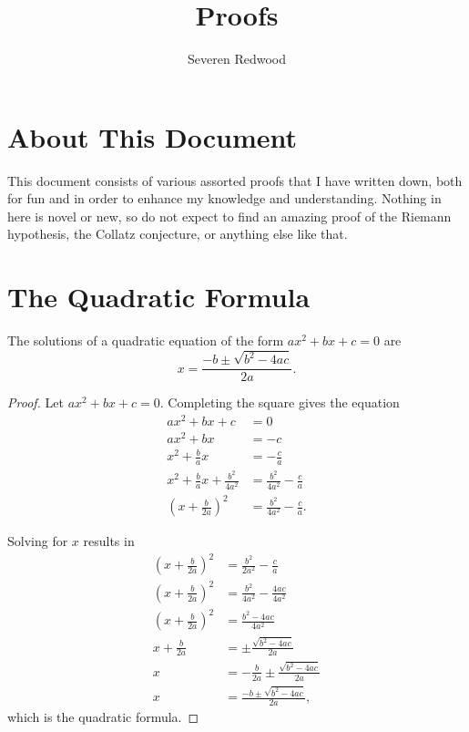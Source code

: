 \documentclass[parskip]{scrartcl}
\title{Proofs}
\author{Severen Redwood}
\begin{document}
\maketitle

\section{About This Document}

This document consists of various assorted proofs that I have written down, both
for fun and in order to enhance my knowledge and understanding. Nothing in here
is novel or new, so do not expect to find an amazing proof of the Riemann
hypothesis, the Collatz conjecture, or anything else like that.

\section{The Quadratic Formula}

\begin{theorem}
  The solutions of a quadratic equation of the form \(ax^{2} + bx + c = 0\) are
  \[ x = \frac{-b ±\sqrt{b^{2} - 4ac}}{2a}. \]
\end{theorem}

\begin{proof}
  Let \(ax^{2} + bx + c = 0\). Completing the square gives the equation
  \begin{align*}
    ax^{2} + bx + c &= 0 \\
    ax^{2} + bx &= -c \\
    x^{2} + \frac{b}{a}x &= -\frac{c}{a} \\
    x^{2} + \frac{b}{a}x + \frac{b^{2}}{4a^{2}} &= \frac{b^{2}}{4a^{2}} - \frac{c}{a} \\
    {(x + \frac{b}{2a})}^{2} &= \frac{b^{2}}{4a^{2}} - \frac{c}{a}.
  \end{align*}

  Solving for \(x\) results in
  \begin{align*}
    {(x + \frac{b}{2a})}^{2} &= \frac{b^{2}}{2a^{2}} - \frac{c}{a} \\
    {(x + \frac{b}{2a})}^{2} &= \frac{b^{2}}{4a^{2}} - \frac{4ac}{4a^{2}} \\
    {(x + \frac{b}{2a})}^{2} &= \frac{b^{2} - 4ac}{4a^{2}} \\
    x + \frac{b}{2a} &= ±\frac{\sqrt{b^{2} - 4ac}}{2a} \\
    x &= -\frac{b}{2a} ±\frac{\sqrt{b^{2} - 4ac}}{2a} \\
    x &= \frac{-b ± \sqrt{b^{2} - 4ac}}{2a},
  \end{align*}
  which is the quadratic formula.
\end{proof}
\end{document}
